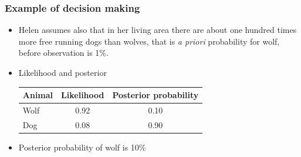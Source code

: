 \documentclass[10pt,handout]{beamer}
\begin{document}
\begin{frame}

\frametitle{Example of decision making}

  \begin{itemize}
  \item<+-> Helen assumes also that in her living area there are about one hundred times more free running dogs than wolves, that is {\em a
      priori} probability for wolf, before observation is 1\%.
  \item<+-> Likelihood and posterior
    \begin{center}\leavevmode
      \begin{tabular}{| l | c c |}
        \hline
        Animal &  Likelihood & Posterior probability \\
        \hline
        Wolf     &  0.92            & 0.10      \\
        Dog    &  0.08        & 0.90    \\
        \hline
      \end{tabular}
    \end{center}
  \item<+-> Posterior probability of wolf is 10\%
  \end{itemize}

\end{frame}
\end{document}
